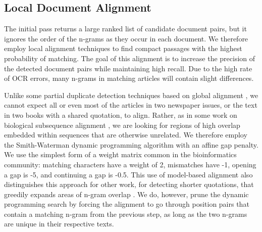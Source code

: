 \documentclass[pdftex,11pt]{article}
\begin{document}
\subsection{Local Document Alignment}
\label{sec:alignment}

The initial pass returns a large ranked list of candidate document
pairs, but it ignores the order of the n-grams as they occur in each
document.  We therefore employ local alignment techniques to find
compact passages with the highest probability of matching.  The goal
of this alignment is to increase the precision of the detected
document pairs while maintaining high recall.  Due to the high rate of
OCR errors, many n-grams in matching articles will contain slight
differences.

Unlike some partial duplicate detection techniques based on global
alignment \citep{yalniz11:_partial_duplic_detec_large_book_collec}, we
cannot expect all or even most of the articles in two newspaper
issues, or the text in two books with a shared quotation, to align.
Rather, as in some work on biological subsequence alignment
\citep{gusfield97:_algor_strin_trees_sequen}, we are looking for
regions of high overlap embedded within sequences that are otherwise
unrelated.  We therefore employ the Smith-Waterman dynamic programming
algorithm with an affine gap penalty.  We use the simplest form of a
weight matrix common in the bioinformatics community: matching
characters have a weight of 2, mismatches have -1, opening a gap is
-5, and continuing a gap is -0.5.  This use of model-based alignment
also distinguishes this approach for other work, for detecting shorter
quotations, that greedily expands areas of n-gram overlap
\citep{kolak08:_gener_links_minin_quotat,horton10:_somet_borrow}.  We
do, however, prune the dynamic programming search by forcing the
alignment to go through position pairs that contain a matching n-gram
from the previous step, as long as the two n-grams are unique in their
respective texts.
\end{document}

